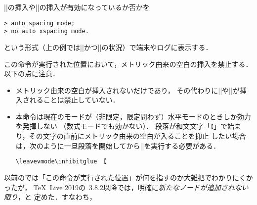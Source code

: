 \documentclass[a4paper,11pt,nomag,dvipdfmx]{jsarticle}
\begin{document}
\begin{cslist}
\csitem[\.{showmode}]
  |\kanjiskip|の挿入や|\xkanjiskip|の挿入が有効になっているか否かを
\begin{verbatim}
> auto spacing mode;
> no auto xspacing mode.
\end{verbatim}
  という形式（上の例では|\autospacing|かつ|\noautoxspacing|の状況）で端末やログに表示する．

\csitem[\.{inhibitglue}]
  この命令が実行された位置において，メトリック由来の空白の挿入を禁止する．以下の点に注意．
\begin{itemize}
 \item メトリック由来の空白が挿入されないだけであり，
       その代わりに|\kanjiskip|や|\xkanjiskip|が挿入されることは禁止していない．
 \item 本命令は現在のモードが（非限定，限定問わず）水平モードのときしか効力を発揮しない
       （数式モードでも効かない）．
       段落が和文文字「\verb+【+」で始まり，その文字の直前にメトリック由来の空白が入ることを抑止
       したい場合は，次のように一旦段落を開始してから|\inhibitglue|を実行する必要がある．
\begin{verbatim}
\leavevmode\inhibitglue 【
\end{verbatim}
\end{itemize}
  以前の\pTeX では「この命令が実行された位置」が何を指すのか大雑把でわかりにくかったが，
  \TeX~Live 2019の\pTeX~3.8.2以降では，明確に\emph{新たなノードが追加されない限り}，と
  定めた\cite{tjb28,forum_2566}．すなわち，
\end{cslist}
\end{document}
